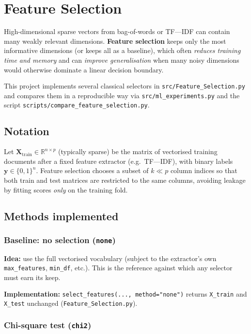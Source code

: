 \documentclass[11pt,a4paper]{report}
\begin{document}
\chapter{Feature Selection}

High-dimensional sparse vectors from bag-of-words or TF---IDF can contain many weakly relevant dimensions. \textbf{Feature selection} keeps only the most informative dimensions (or keeps all as a baseline), which often \emph{reduces training time and memory} and can \emph{improve generalisation} when many noisy dimensions would otherwise dominate a linear decision boundary.

This project implements several classical selectors in \texttt{src/Feature\_Selection.py} and compares them in a reproducible way via \texttt{src/ml\_experiments.py} and the script \texttt{scripts/compare\_feature\_selection.py}.

\section{Notation}

Let $\mathbf{X}_{\mathrm{train}} \in \mathbb{R}^{n \times p}$ (typically sparse) be the matrix of vectorised training documents after a fixed feature extractor (e.g.\ TF---IDF), with binary labels $\mathbf{y} \in \{0,1\}^n$. Feature selection chooses a subset of $k \ll p$ column indices so that both train and test matrices are restricted to the same columns, avoiding leakage by fitting scores \emph{only} on the training fold.

\section{Methods implemented}

\subsection{Baseline: no selection (\texttt{none})}

\textbf{Idea:} use the full vectorised vocabulary (subject to the extractor's own \texttt{max\_features}, \texttt{min\_df}, etc.). This is the reference against which any selector must earn its keep.

\textbf{Implementation:} \texttt{select\_features(..., method="none")} returns \texttt{X\_train} and \texttt{X\_test} unchanged (\texttt{Feature\_Selection.py}).

\subsection{Chi-square test (\texttt{chi2})}
\end{document}
